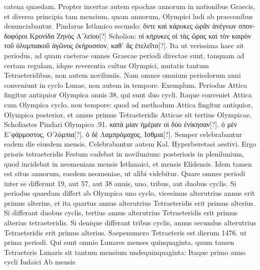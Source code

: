 catena quaedam.
Propter incertas autem epochas annorum in nationibus
Graecis, et diversa principia tam mensium, quam annorum, Olympici
ludi ab praeconibus denunciabantur.
%
Pindarus Isthmico secundo:
\textgreek{ὅντε καὶ κάρυκες ὡρᾶν ἀνέγνων σπονδοφόροι Κρονίδα Ζηνὸς Α᾽λείου[?]}
Scholion: \textgreek{οἱ κήρυκες οἱ τὰς ὥρας καὶ τὸν καιρὸν τοῦ ὀλυμπιακοῦ ἀγῶνος
ἐκήρυσσον, καθ᾽ ἅς ἐτελεῖτο[?]}.
Ita ut verissima haec sit periodus, ad
quam caeterae omnes Graecae periodi directae sunt, tanquam ad certam
regulam, idque reverentia cultus Olympici, mutatis tantum Tetraeteridibus,
non autem noviluniis.
Nam omnes omnium periodorum anni
conveniunt in cyclo Lunae, non autem in tempore.
Exemplum.
Periodus
Attica fingitur antiquior Olympica annis 38, qui sunt duo cycli.
Itaque conveniet Attica cum Olympica cyclo, non tempore: quod
ad methodum Attica fingitur antiquior, Olympica posterior, et annus
primus Tetraeteridis Atticae sit tertius Olympicae.
Scholiastes Pindari
Olympico .91. \textgreek{κατὰ μίαν ἡμέραν οἱ δύο ἐνίκησαν[?]}.
\textgreek{ὁ μὲν Ε᾽φάρμοστος, Ο᾽λύμπια[?]}.
\textgreek{ὁ δὲ Λαμπρόμαχος, Ισθμια[?]}.
Semper celebrabantur eadem die
eiusdem mensis.
Celebrabantur autem Kal. Hyperberetaei aestivi.
Ergo
prioris tetraeteridis Festum cadebat in novilunium: posterioris in plenilunium,
quod incidebat in neomeniam mensis Isthmaici, et  mensis
Elidensis.
Idem tamen est situs annorum, eaedem neomeniae, ut alibi
videbitur.
Quare omnes periodi inter se differunt 19, aut 57, aut 38
annis, uno, tribus, aut duobus cyclis.
Si periodus quaedam differt ab
Olympica uno cyclo, vicesimus alterutrius annus erit primus alterius,
et ita quartus annus alterutrius Tetraeteridis erit primus alterius.
Si differant
duobus cyclis, tertius annus alterutrius Tetraeteridis erit primus
alterius tetraeteridis.
Si denique differant tribus cyclis, annus secundus
alterutrius Tetraeteridis erit primus alterius.
Saepenumero Tetraeteris
est dierum 1476. ut prima periodi.
Qui sunt omnio Lunares
menses quinquaginta, quum tamen Tetraeteris Lunaris sit tantum
mensium undequinquaginta: Itaque primo anno cycli Iudaici Ab mensis
